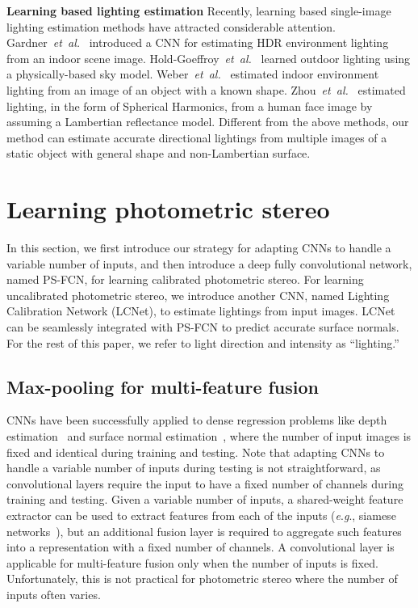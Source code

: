 \documentclass[10pt,journal,compsoc]{IEEEtran}
\newcommand{\etal}{\textit{et~al.}}
\newcommand{\eg}{\textit{e}.\textit{g}.}
\newcommand{\rev}[1]{#1}
\renewcommand{\paragraph}[1]{\vspace{0.2em}\noindent \textbf{#1 \hspace{0.2em}}}
\begin{document}
\paragraph{Learning based lighting estimation}
Recently, learning based single-image lighting estimation methods have attracted considerable attention. Gardner~\etal~\cite{gardner2017learning} introduced a CNN for estimating HDR environment lighting from an indoor scene image. Hold-Goeffroy~\etal~\cite{hold2017deep} learned outdoor lighting using a physically-based sky model. Weber~\etal~\cite{weber2018learning} estimated indoor environment lighting from an image of an object with a known shape.  Zhou~\etal~\cite{Zhou_2018_CVPR} estimated lighting, in the form of Spherical Harmonics, from a human face image by assuming a Lambertian reflectance model. Different from the above methods, our method can estimate accurate directional lightings from multiple images of a static object with general shape and non-Lambertian surface.


\section{Learning photometric stereo}
In this section, we first introduce our strategy for adapting CNNs to handle a variable number of inputs, and then introduce a deep fully convolutional network, named PS-FCN, for learning calibrated photometric stereo. For learning uncalibrated photometric stereo, we introduce another CNN, named Lighting Calibration Network (LCNet), to estimate lightings from input images. LCNet can be seamlessly integrated with PS-FCN to predict accurate surface normals.
\rev{For the rest of this paper, we refer to light direction and intensity as ``lighting.''}


\subsection{Max-pooling for multi-feature fusion}
CNNs have been successfully applied to dense regression problems like depth estimation~\cite{eigen2014depth} and surface normal estimation~\cite{wang2015designing}, where the number of input images is fixed and identical during training and testing. Note that adapting CNNs to handle a variable number of inputs during testing is not straightforward, as convolutional layers require the input to have a fixed number of channels during training and testing. Given a variable number of inputs, a shared-weight feature extractor can be used to extract features from each of the inputs (\eg, siamese networks~\cite{bromley1993signature}), but an additional fusion layer is required to aggregate such features into a representation with a fixed number of channels. A convolutional layer is applicable for multi-feature fusion only when the number of inputs is fixed. Unfortunately, this is not practical for photometric stereo where the number of inputs often varies.
\end{document}
